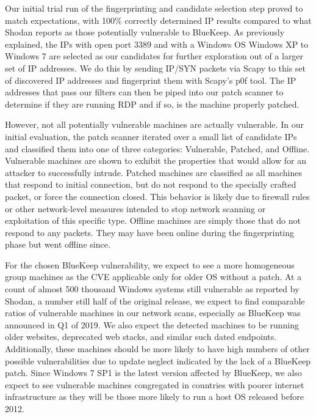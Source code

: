 Our initial trial run of the fingerprinting and candidate selection step proved to match expectations, with 100\% correctly determined IP results compared to what Shodan reports as those potentially vulnerable to BlueKeep. As previously explained, the IPs with open port 3389 and with a Windows OS Windows XP to Windows 7 are selected as our candidates for further exploration out of a larger set of IP addresses. We do this by sending IP/SYN packets via Scapy to this set of discovered IP addresses and fingerprint them with Scapy's p0f tool. The IP addresses that pass our filters can then be piped into our patch scanner to determine if they are running RDP and if so, is the machine properly patched.

However, not all potentially vulnerable machines are actually vulnerable. In our initial evaluation, the patch scanner iterated over a small list of candidate IPs and classified them into one of three categories: Vulnerable, Patched, and Offline. Vulnerable machines are shown to exhibit the properties that would allow for an attacker to successfully intrude. Patched machines are classified as all machines that respond to initial connection, but do not respond to the specially crafted packet, or force the connection closed. This behavior is likely due to firewall rules or other network-level measures intended to stop network scanning or exploitation of this specific type. Offline machines are simply those that do not respond to any packets. They may have been online during the fingerprinting phase but went offline since.

For the chosen BlueKeep vulnerability, we expect to see a more homogeneous group machines as the CVE applicable only for older OS without a patch. At a count of almost 500 thousand Windows systems still vulnerable as reported by Shodan, a number still half of the original release, we expect to find comparable ratios of vulnerable machines in our network scans, especially as BlueKeep was announced in Q1 of 2019. We also expect the detected machines to be running older websites, deprecated web stacks, and similar such dated endpoints. Additionally, these machines should be more likely to have high numbers of other possible vulnerabilities due to update neglect indicated by the lack of a BlueKeep patch. Since Windows 7 SP1 is the latest version affected by BlueKeep, we also expect to see vulnerable machines congregated in countries with poorer internet infrastructure as they will be those more likely to run a host OS released before 2012.